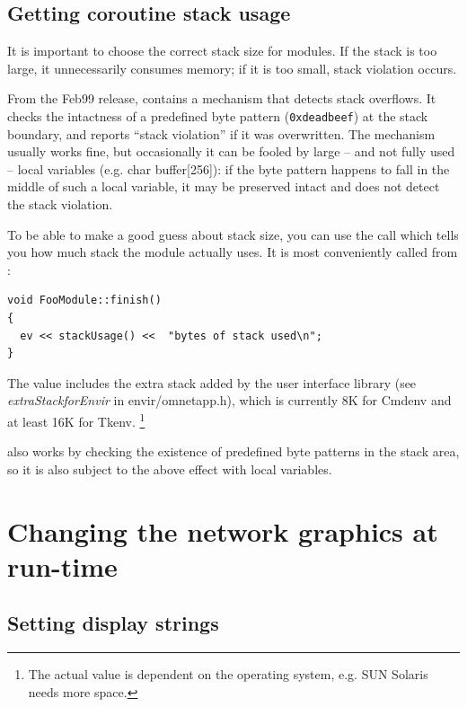 \subsection{Getting coroutine stack usage}

It is important to choose the correct stack size for
modules.  If the stack is
too large, it unnecessarily consumes memory; if it is too small, stack
violation occurs.

From the Feb99 release, {\opp} contains a mechanism that detects stack
overflows. It checks the intactness of a
predefined byte pattern (\texttt{0xdeadbeef}) at the stack boundary,
and reports ``stack violation'' if it was
overwritten. The mechanism usually works fine, but occasionally it can
be fooled by large -- and not fully used -- local variables (e.g. char
buffer[256]): if the byte pattern happens to fall in the middle of
such a local variable, it may be preserved intact and {\opp} does not
detect the stack violation.

To be able to make a good guess about stack size, you can use
the  call which tells you how much stack the module
actually uses. It is most conveniently called from :

\begin{verbatim}
void FooModule::finish()
{
  ev << stackUsage() <<  "bytes of stack used\n";
}
\end{verbatim}


The value includes the extra stack added by the user interface library
(see \textit{extraStackforEnvir} in
envir/omnetapp.h), which is currently 8K for Cmdenv and at least 16K
for Tkenv.
  \footnote{The actual value is dependent on the operating
  system, e.g. SUN Solaris needs more space.}

also works by checking the existence of predefined
byte patterns in the stack area, so it is also subject to the above
effect with local variables.


\section{Changing the network graphics at run-time}

\subsection{Setting display strings}

